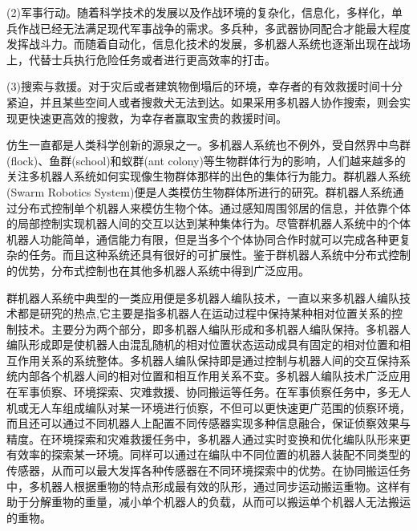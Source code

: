 	(2)军事行动。随着科学技术的发展以及作战环境的复杂化，信息化，多样化，单兵作战已经无法满足现代军事战争的需求。多兵种，多武器协同配合才能最大程度发挥战斗力。而随着自动化，信息化技术的发展，多机器人系统也逐渐出现在战场上，代替士兵执行危险任务或者进行更高效率的打击。
	
	(3)搜索与救援。对于灾后或者建筑物倒塌后的环境，幸存者的有效救援时间十分紧迫，并且某些空间人或者搜救犬无法到达。如果采用多机器人协作搜索，则会实现更快速更高效的搜救，为幸存者赢取宝贵的救援时间。
	
仿生一直都是人类科学创新的源泉之一。多机器人系统也不例外，受自然界中鸟群(flock)、鱼群(school)和蚁群(ant colony)等生物群体行为的影响\supercite{stilwell1993toward,theraulaz1991task,reif1999social,balch2000social,couceiro2011novel}，人们越来越多的关注多机器人系统如何实现像生物群体那样的出色的集体行为能力。群机器人系统(Swarm Robotics System)便是人类模仿生物群体所进行的研究\supercite{duarte2016application,duarte2016hybrid,yu2015duration,trianni2015fundamental}。群机器人系统通过分布式控制单个机器人来模仿生物个体。通过感知周围邻居的信息，并依靠个体的局部控制实现机器人间的交互以达到某种集体行为\supercite{viksnin2016flocking,shi2012survey}。尽管群机器人系统中的个体机器人功能简单，通信能力有限，但是当多个个体协同合作时就可以完成各种更复杂的任务。而且这种系统还具有很好的可扩展性。鉴于群机器人系统中分布式控制的优势，分布式控制也在其他多机器人系统中得到广泛应用。
	
群机器人系统中典型的一类应用便是多机器人编队技术，一直以来多机器人编队技术都是研究的热点,它主要是指多机器人在运动过程中保持某种相对位置关系的控制技术\supercite{alonso2016distributed,tang2015research,yang2016behavioral}。主要分为两个部分，即多机器人编队形成和多机器人编队保持。多机器人编队形成即是使机器人由混乱随机的相对位置状态运动成具有固定的相对位置和相互作用关系的系统整体。多机器人编队保持即是通过控制与机器人间的交互保持系统内部各个机器人间的相对位置和相互作用关系不变。多机器人编队技术广泛应用在军事侦察\supercite{柳林2006多机器人系统任务分配及编队控制研究}、环境探索\supercite{renoux2015decision,abed2015multi,benavides2016multi}、灾难救援\supercite{bagosi2016ontological,liu2015multirobot,lee2016information}、协同搬运\supercite{wang2008machine,cheng2016research,fyler2015distributed}等任务。在军事侦察任务中，多无人机或无人车组成编队对某一环境进行侦察，不但可以更快速更广范围的侦察环境，而且还可以通过不同机器人上配置不同传感器实现多种信息融合，保证侦察效果与精度。在环境探索和灾难救援任务中，多机器人通过实时变换和优化编队队形来更有效率的探索某一环境。同样可以通过在编队中不同位置的机器人装配不同类型的传感器，从而可以最大发挥各种传感器在不同环境探索中的优势。在协同搬运任务中，多机器人根据重物的特点形成最有效的队形，通过同步运动搬运重物。这样有助于分解重物的重量，减小单个机器人的负载，从而可以搬运单个机器人无法搬运的重物。

